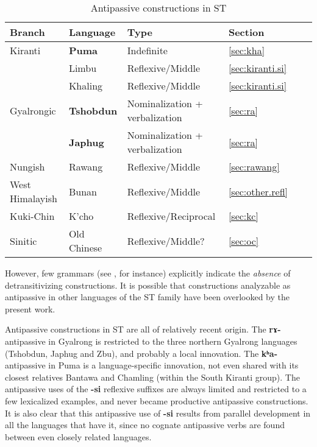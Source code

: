 \documentclass[oneside,a4paper,11pt]{article}
\newcommand{\ipa}[1]{{\phon\textbf{#1}}}
\begin{document}
\begin{table}[h]
\caption{Antipassive constructions in ST} \label{tab:summary} \centering
\begin{tabular}{llllll}
\toprule
Branch & Language & Type & Section \\
\midrule
Kiranti & \textbf{Puma} & Indefinite & \ref{sec:kha} \\
&Limbu & Reflexive/Middle & \ref{sec:kiranti.si} \\
&Khaling & Reflexive/Middle & \ref{sec:kiranti.si} \\
Gyalrongic & \textbf{Tshobdun} & Nominalization + verbalization & \ref{sec:ra} \\
  & \textbf{Japhug} & Nominalization + verbalization&  \ref{sec:ra}   \\
  Nungish & Rawang & Reflexive/Middle & \ref{sec:rawang} \\
  West Himalayish & Bunan & Reflexive/Middle  & \ref{sec:other.refl} \\
Kuki-Chin & K'cho  & Reflexive/Reciprocal &\ref{sec:kc}\\
Sinitic & Old Chinese  & Reflexive/Middle? & \ref{sec:oc} \\
\bottomrule
\end{tabular}
\end{table} 

However, few grammars (see \citealt[83]{tournadre96erg}, \citealt[108]{genetti07grammar} for instance) explicitly indicate the \textit{absence} of detransitivizing constructions. It is possible that constructions analyzable as antipassive in other languages of the ST family have been overlooked by the present work.%

Antipassive constructions in ST are all of relatively recent origin. The \ipa{rɤ-} antipassive in Gyalrong is restricted to the three northern Gyalrong languages (Tshobdun, Japhug and Zbu), and probably a local innovation. The \ipa{kʰa-} antipassive in Puma is a language-specific innovation, not even shared with its closest relatives Bantawa and Chamling (within the South Kiranti group). The antipassive uses of the \ipa{-si} reflexive suffixes are always limited and restricted to a few lexicalized examples, and never became productive antipassive constructions. It is also clear that this antipassive use of \ipa{-si} results from parallel development in all the languages that have it, since no cognate antipassive verbs are found between even closely related languages.
\end{document}
